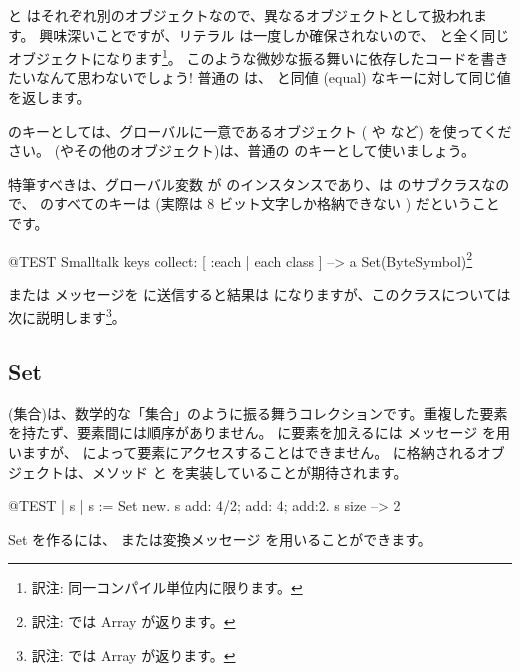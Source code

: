 \documentclass[a4paper,10pt,twoside]{book}
\begin{document}
\noindent
{} と  はそれぞれ別のオブジェクトなので、異なるオブジェクトとして扱われます。
興味深いことですが、リテラル \mbox{} は一度しか確保されないので、 と全く同じオブジェクトになります\footnote{訳注: 同一コンパイル単位内に限ります。}。
このような微妙な振る舞いに依存したコードを書きたいなんて思わないでしょう!
普通の  は、 と同値 (equal) なキーに対して同じ値を返します。

 のキーとしては、グローバルに一意であるオブジェクト ( や  など) を使ってください。 (やその他のオブジェクト)は、普通の  のキーとして使いましょう。


特筆すべきは、グローバル変数  が  のインスタンスであり、は  のサブクラスなので、 のすべてのキーは  (実際は 8 ビット文字しか格納できない ) だということです。

\begin{code}{@TEST}
Smalltalk keys collect: [ :each | each class ] --> a Set(ByteSymbol)\footnote{訳注:  では Array が返ります。}
\end{code}
\noindent
{} または  メッセージを  に送信すると結果は  になりますが、このクラスについては次に説明します\footnote{訳注:  では Array が返ります。}。

\subsection{Set}
 (集合)は、数学的な「集合」のように振る舞うコレクションです。\ie 重複した要素を持たず、要素間には順序がありません。 に要素を加えるには メッセージ を用いますが、 によって要素にアクセスすることはできません。 に格納されるオブジェクトは、メソッド  と \ct{=} を実装していることが期待されます。

\begin{code}{@TEST | s | }
s := Set new.
s add: 4/2; add: 4; add:2.
s size --> 2
\end{code}

Set を作るには、 または変換メッセージ  を用いることができます。
\end{document}
